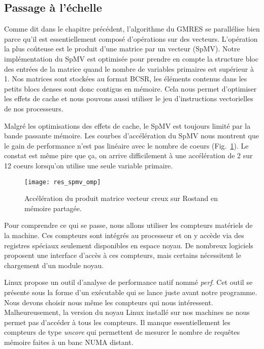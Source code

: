 \subsection{Passage à l'échelle}
\label{sec:compteur}
Comme dit dans le chapitre précédent, l'algorithme du GMRES se parallélise bien parce qu'il est essentiellement composé d'opérations sur des vecteurs.
%
L'opération la plus coûteuse est le produit d'une matrice par un vecteur (SpMV).
%
Notre implémentation du SpMV est optimisée pour prendre en compte la structure bloc des entrées de la matrice quand le nombre de variables primaires est supérieur à 1.
%
Nos matrices sont stockées au format BCSR, les éléments contenus dans les petits blocs denses sont donc contigus en mémoire.
%
Cela nous permet d'optimiser les effets de cache et nous pouvons aussi utiliser le jeu d'instructions vectorielles de nos processeurs.

Malgré les optimisations des effets de cache, le SpMV est toujours limité par la bande passante mémoire.
%
Les courbes d'accélération du SpMV nous montrent que le gain de performance n'est pas linéaire avec le nombre de coeurs (Fig.~\ref{fig:res_spmv_omp_rostand}).
%
Le constat est même pire que ça, on arrive difficilement à une accélération de 2 sur 12 coeurs lorsqu'on utilise une seule variable primaire.
\begin{figure}[!h]
  \centering
  \texttt{[image: res\_spmv\_omp]}
  \caption{Accélération du produit matrice vecteur creux sur Rostand en mémoire partagée.}
  \label{fig:res_spmv_omp_rostand}
\end{figure}

Pour comprendre ce qui se passe, nous allons utiliser les compteurs matériels de la machine.
%
Ces compteurs sont intégrés au processeur et on y accède via des registres spéciaux seulement disponibles en espace noyau.
%
De nombreux logiciels proposent une interface d'accès à ces compteurs, mais certains nécessitent le chargement d'un module noyau.


Linux propose un outil d'analyse de performance natif nommé {\em perf}.
%
Cet outil se présente sous la forme d'un exécutable qui se lance juste avant notre programme.
%
Nous devons choisir nous même les compteurs qui nous intéressent.
%
Malheureusement, la version du noyau Linux installé sur nos machines ne nous permet pas d'accéder à tous les compteurs.
%
Il manque essentiellement les compteurs de type {\em uncore} qui permettent de mesurer le nombre de requêtes mémoire faites à un banc NUMA distant.




